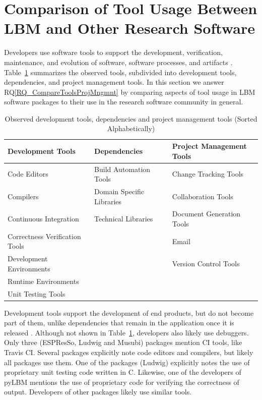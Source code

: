 \documentclass[final, 3p, times, authoryear]{elsarticle}
\newcommand{\rqref}[1]{RQ\ref{#1}}
\begin{document}
\section{Comparison of Tool Usage Between LBM and Other Research Software}
\label{Sec_CompareTools}

Developers use software tools to support the development, verification,
maintenance, and evolution of software, software processes, and artifacts
\citep[p.\ 501]{GhezziEtAl2003}. Table~\ref{tbl_tools} summarizes the observed
tools, subdivided into development tools, dependencies, and project management
tools. In this section we answer \rqref{RQ_CompareToolsProjMngmnt} by comparing
aspects of tool usage in LBM software packages to their use in the research
software community in general.

\begin{table}[ht!]
	\begin{center}
	\begin{tabular}{ p{5.3 cm} p{4.9 cm} p{5 cm}}
	\toprule
	\textbf{Development Tools} & \textbf{Dependencies} & \textbf{Project
	Management Tools} \\
	\midrule
	Code Editors & Build Automation Tools & Change Tracking Tools\\
	Compilers & Domain Specific Libraries & Collaboration Tools\\
	Continuous Integration & Technical Libraries & Document Generation Tools\\
	Correctness Verification Tools &  & Email\\
	Development Environments &  & Version Control Tools\\
	Runtime Environments &  & \\
	Unit Testing Tools &  & \\
	\bottomrule
	\end{tabular}
	\caption{Observed development tools, dependencies and project management
	tools (Sorted Alphabetically)} \label{tbl_tools}
	\end{center}
\end{table}

Development tools support the development of end products, but do not become
part of them, unlike dependencies that remain in the application once it is
released \citep[p.\ 506]{GhezziEtAl2003}. Although not shown in
Table~\ref{tbl_tools}, developers also likely use debuggers.  Only three
(ESPResSo, Ludwig and Musubi) packages mention CI tools, like Travis CI. Several
packages explicitly note code editors and compilers, but likely all packages use
them. One of the packages (Ludwig) explicitly notes the use of proprietary unit
testing code written in C. Likewise, one of the developers of pyLBM mentions the
use of proprietary code for verifying the correctness of output. Developers of
other packages likely use similar tools.
\end{document}
